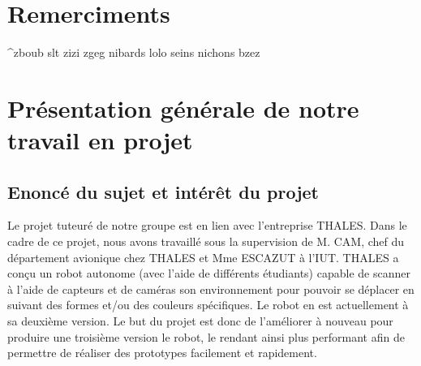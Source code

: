 \documentclass{PackagerQualityN}
\begin{document}
\newp       %
\setcounter{tocdepth}{2}
\tableofcontents
{}









\newp       %
\paragraph{}

\section*{Remerciments}
^zboub
slt
zizi
zgeg
nibards
lolo
seins
nichons
bzez

\newp

\section*{Présentation générale de notre travail en projet}
\subsection*{Enoncé du sujet et intérêt du projet}
Le projet tuteuré de notre groupe est en lien avec l’entreprise THALES.
Dans le cadre de ce projet, nous avons travaillé sous la supervision de M. CAM, chef du département avionique chez THALES et Mme ESCAZUT à l’IUT.
THALES a conçu un robot autonome (avec l'aide de différents étudiants) capable de scanner à l’aide de capteurs et de caméras son environnement pour pouvoir se déplacer en suivant des formes et/ou des couleurs spécifiques. Le robot en est actuellement à sa deuxième version. Le but du projet est donc de l'améliorer à nouveau pour produire une troisième version le robot, le rendant ainsi plus performant afin de permettre de réaliser des prototypes facilement et rapidement.\\
\end{document}
